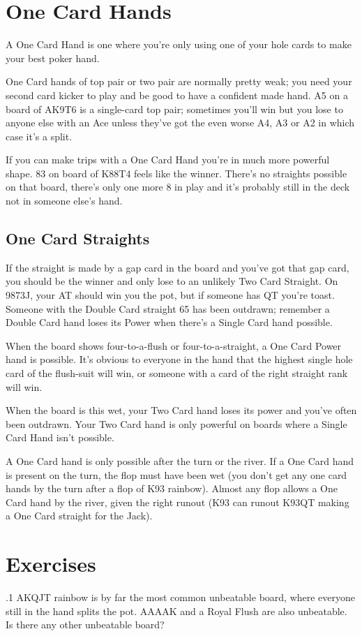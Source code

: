 \section{One Card Hands}

A One Card Hand is one where you're only using one of your hole
cards to make your best poker hand.

One Card hands of top pair or two pair are normally pretty weak;
you need your second card kicker to play and be good to have a
confident made hand. A5 on a board of AK9T6 is a single-card top pair;
sometimes you'll win but you lose to anyone else with an Ace unless
they've got the even worse A4, A3 or A2 in which case it's a split.

If you can make trips with a One Card Hand you're in much more
powerful shape. 83 on board of K88T4 feels like the winner. There's no
straights possible on that board, there's only one more 8 in play and
it's probably still in the deck not in someone else's hand.

\subsection{One Card Straights}

If the straight is made by a gap card in the board and you've got that
gap card, you should be the winner and only lose to an unlikely Two
Card Straight. On 9873J, your AT should win you the pot, but if
someone has QT you're toast. Someone with the Double Card straight 65
has been outdrawn; remember a Double Card hand loses its Power when
there's a Single Card hand possible.

When the board shows four-to-a-flush or four-to-a-straight, a One
Card Power hand is possible. It's obvious to everyone in the hand that
the highest single hole card of the flush-suit will win, or someone
with a card of the right straight rank will win.

When the board is this wet, your Two Card hand loses its power and
you've often been outdrawn. Your Two Card hand is only powerful on
boards where a Single Card Hand isn't possible.

A One Card hand is only possible after the turn or the river. If a
One Card hand is present on the turn, the flop must have been wet
(you don't get any one card hands by the turn after a flop of K93
rainbow). Almost any flop allows a One Card hand by the river,
given the right runout (K93 can runout K93QT making a One Card
straight for the Jack).

\section{Exercises}

.1 AKQJT rainbow is by far the most common unbeatable
board, where everyone still in the hand splits the pot. AAAAK and a
Royal Flush are also unbeatable. Is there any other unbeatable board?

